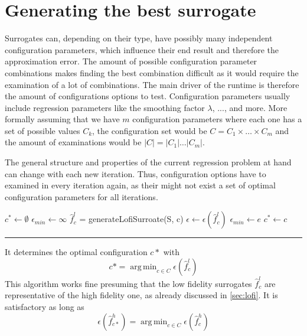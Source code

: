 \documentclass[
  a4paper,  %
  twoside,  %
  bibliography=totoc,
  headsepline,
  cleardoublepage=empty,
  parskip=half,
  draft=false
]{scrbook}
\DeclareMathOperator*{\argmin}{arg\,min}
\newcommand{\delimit}{{\color{charcoal}\noindent\rule{\textwidth}{1pt}}}
\begin{document}
\section{Generating the best surrogate}

Surrogates can, depending on their type, have possibly many independent configuration parameters, which influence their end result and therefore the approximation error.
The amount of possible configuration parameter combinations makes finding the best combination difficult as it would require the examination of a lot of combinations.
The main driver of the runtime is therefore the amount of configurations options to test.
Configuration parameters usually include regression parameters like the smoothing factor $\lambda$, ..., and more.
More formally assuming that we have $m$ configuration parameters where each one has a set of possible values $C_k$, the configuration set would be $C=C_1 \times \dots \times C_m$ and the amount of examinations would be $|C|=|C_1| \dots |C_m|$.

The general structure and properties of the current regression problem at hand can change with each new iteration.
Thus, configuration options have to examined in every iteration again, as their might not exist a set of optimal configuration 
parameters for all iterations.

\begin{mdframed}[style=algstyle,frametitle={\textbf{function} \texttt{generateBestSurroate}{$(S_t, C, \epsilon)$}}]
\normalsize
\vspace{5.5mm}
\begin{algorithmic}[1]
    \State $c^\ast \gets \emptyset$
    \State $\epsilon_{min} \gets \infty$
      \State $\hat{f}_c^l$ = generateLofiSurroate(S, c)
    	\State $\epsilon \gets \epsilon(\hat{f}_c^l)$
    	  \State $\epsilon_{min}\gets e$
    	\State $c^\ast \gets c$
    	\EndIf
    \EndFor
    \State {}
\end{algorithmic}
\vspace{-1.5mm}
\delimit
	\label{alg:bestsur}
\end{mdframed}


It determines the optimal configuration $c*$ with
\begin{equation}
c*=\argmin_{c \in C} \epsilon(\hat{f}_c^l)
\end{equation}
This algorithm works fine presuming that the low fidelity surrogates $\hat{f}_c^l$ are representative of the high fidelity one, as already discussed in \cref{sec:lofi}.
It is satisfactory as long as 
\begin{equation}
\epsilon(\hat{f}_{c*}^h)=\argmin_{c \in C} \epsilon(\hat{f}_c^h)
\end{equation}
\end{document}
